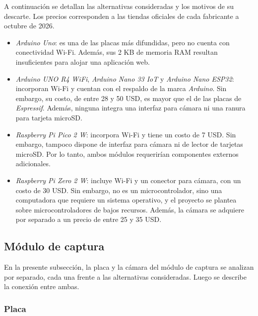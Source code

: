 A continuación se detallan las alternativas consideradas y los motivos de su descarte. Los precios corresponden a las tiendas oficiales de cada fabricante a octubre de 2026.

\begin{itemize}

\item \emph{Arduino Uno}: es una de las placas más difundidas, pero no cuenta con conectividad Wi-Fi. Además, sus 2 KB de memoria RAM resultan insuficientes para alojar una aplicación web.

\item \emph{Arduino UNO R4 WiFi}, \emph{Arduino Nano 33 IoT} y \emph{Arduino Nano ESP32}: incorporan Wi-Fi y cuentan con el respaldo de la marca \emph{Arduino}. Sin embargo, su costo, de entre 28 y 50 USD, es mayor que el de las placas de \emph{Espressif}. Además, ninguna integra una interfaz para cámara ni una ranura para tarjeta microSD.

\item \emph{Raspberry Pi Pico 2 W}: incorpora Wi-Fi y tiene un costo de 7 USD. Sin embargo, tampoco dispone de interfaz para cámara ni de lector de tarjetas microSD. Por lo tanto, ambos módulos requerirían componentes externos adicionales.

\item \emph{Raspberry Pi Zero 2 W}: incluye Wi-Fi y un conector para cámara, con un costo de 30 USD. Sin embargo, no es un microcontrolador, sino una computadora que requiere un sistema operativo, y el proyecto se plantea sobre microcontroladores de bajos recursos. Además, la cámara se adquiere por separado a un precio de entre 25 y 35 USD.

\end{itemize}


\subsection{Módulo de captura}

En la presente subsección, la placa y la cámara del módulo de captura se analizan por separado, cada una frente a las alternativas consideradas. Luego se describe la conexión entre ambas.

\subsubsection{Placa}

